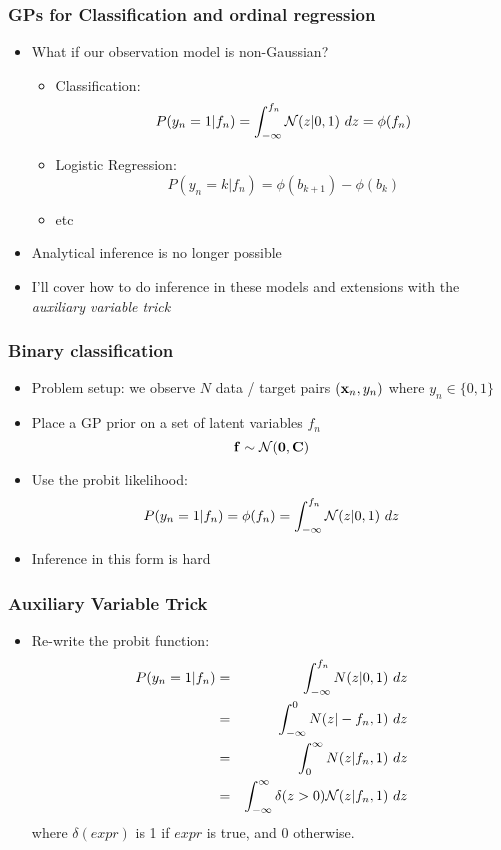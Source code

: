 
\begin{frame}
	\frametitle{GPs for Classification and ordinal regression}
	\begin{itemize}
		\item What if our observation model is non-Gaussian?
		\begin{itemize}
			\item Classification:
			\[
				P(y_n=1|f_n) = \int_{-\infty}^{f_n} {\cal N}(z|0,1)~dz = \phi(f_n)
			\]
			\item Logistic Regression:
			\[	
				P(y_n=k|f_n) = \phi(b_{k+1}) - \phi(b_k)
			\]
			\item etc
		\end{itemize}
		\item Analytical inference is no longer possible
		\item I'll cover how to do inference in these models and extensions with the \emph{auxiliary variable trick}
	\end{itemize}
\end{frame}


\begin{frame}
	\frametitle{Binary classification}
	\begin{itemize}
		\item Problem setup: we observe $N$ data / target pairs $(\mathbf{x}_n,y_n)$ where $y_n\in \{0,1\}$
		\item Place a GP prior on a set of latent variables $f_n$
		\[
			\mathbf{f} \sim {\cal N}(\mathbf{0},\mathbf{C})
		\]
		\item Use the probit likelihood:
		\[
			P(y_n=1|f_n) = \phi(f_n) = \int_{-\infty}^{f_n} {\cal N}(z|0,1)~dz
		\]
		\item Inference in this form is hard
	\end{itemize}
\end{frame}

\begin{frame}
	\frametitle{Auxiliary Variable Trick}
	\begin{itemize}
		\item Re-write the probit function:
		\begin{eqnarray}
			\nonumber P(y_n=1|f_n) &=& \int_{-\infty}^{f_n} N(z|0,1)~dz\\
			\nonumber & =& \int_{-\infty}^{0} N(z|-f_n,1)~dz\\
			\nonumber &=& \int_{0}^{\infty} N(z|f_n,1)~dz \\
			\nonumber &=& \int_{-\infty}^{\infty} \delta(z>0){\cal N}(z|f_n,1)~dz
		\end{eqnarray}
		where $\delta(expr)$ is 1 if $expr$ is true, and 0 otherwise.
	\end{itemize}
\end{frame}

